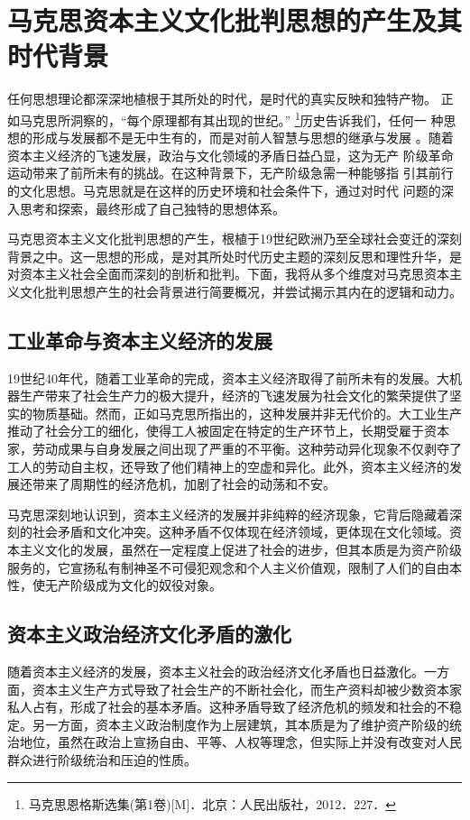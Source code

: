 \documentclass[a4paper]{ctexart}
\begin{document}
\newpage
\section{马克思资本主义文化批判思想的产生及其时代背景}
任何思想理论都深深地植根于其所处的时代，是时代的真实反映和独特产物。
正如马克思所洞察的，“每个原理都有其出现的世纪。”
\footnote{马克思恩格斯选集(第1卷)[M]．北京：人民出版社，2012．227．
}历史告诉我们，任何一
种思想的形成与发展都不是无中生有的，而是对前人智慧与思想的继承与发展
。随着资本主义经济的飞速发展，政治与文化领域的矛盾日益凸显，这为无产
阶级革命运动带来了前所未有的挑战。在这种背景下，无产阶级急需一种能够指
引其前行的文化思想。马克思就是在这样的历史环境和社会条件下，通过对时代
问题的深入思考和探索，最终形成了自己独特的思想体系。


马克思资本主义文化批判思想的产生，根植于19世纪欧洲乃至全球社会变迁的深刻背景之中。这一思想的形成，是对其所处时代历史主题的深刻反思和理性升华，是对资本主义社会全面而深刻的剖析和批判。下面，我将从多个维度对马克思资本主义文化批判思想产生的社会背景进行简要概况，并尝试揭示其内在的逻辑和动力。

\subsection{工业革命与资本主义经济的发展}

19世纪40年代，随着工业革命的完成，资本主义经济取得了前所未有的发展。大机器生产带来了社会生产力的极大提升，经济的飞速发展为社会文化的繁荣提供了坚实的物质基础。然而，正如马克思所指出的，这种发展并非无代价的。大工业生产推动了社会分工的细化，使得工人被固定在特定的生产环节上，长期受雇于资本家，劳动成果与自身发展之间出现了严重的不平衡。这种劳动异化现象不仅剥夺了工人的劳动自主权，还导致了他们精神上的空虚和异化。此外，资本主义经济的发展还带来了周期性的经济危机，加剧了社会的动荡和不安。

马克思深刻地认识到，资本主义经济的发展并非纯粹的经济现象，它背后隐藏着深刻的社会矛盾和文化冲突。这种矛盾不仅体现在经济领域，更体现在文化领域。资本主义文化的发展，虽然在一定程度上促进了社会的进步，但其本质是为资产阶级服务的，它宣扬私有制神圣不可侵犯观念和个人主义价值观，限制了人们的自由本性，使无产阶级成为文化的奴役对象。
\subsection{资本主义政治经济文化矛盾的激化}

随着资本主义经济的发展，资本主义社会的政治经济文化矛盾也日益激化。一方面，资本主义生产方式导致了社会生产的不断社会化，而生产资料却被少数资本家私人占有，形成了社会的基本矛盾。这种矛盾导致了经济危机的频发和社会的不稳定。另一方面，资本主义政治制度作为上层建筑，其本质是为了维护资产阶级的统治地位，虽然在政治上宣扬自由、平等、人权等理念，但实际上并没有改变对人民群众进行阶级统治和压迫的性质。
\end{document}
